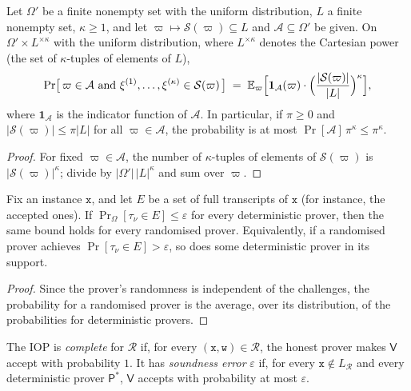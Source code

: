 \begin{lemma}\label{lem:queries}
Let $\Omega'$ be a finite nonempty set with the uniform distribution, $L$ a finite nonempty set, $\kappa \ge 1$, and let $\varpi \mapsto \mathcal{S}(\varpi) \subseteq L$ and $\mathcal{A} \subseteq \Omega'$ be given.
On $\Omega' \times L^{\times\kappa}$ with the uniform distribution, where $L^{\times\kappa}$ denotes the Cartesian power (the set of $\kappa$-tuples of elements of $L$),
\[
  \Pr\bigl[\, \varpi \in \mathcal{A} \text{ and } \xi^{(1)},\dots,\xi^{(\kappa)} \in \mathcal{S}(\varpi) \,\bigr] \;=\; \mathbb{E}_{\varpi}\Bigl[\mathbf{1}_{\mathcal{A}}(\varpi) \cdot \Bigl(\frac{|\mathcal{S}(\varpi)|}{|L|}\Bigr)^{\kappa}\Bigr],
\]
where $\mathbf{1}_{\mathcal{A}}$ is the indicator function of $\mathcal{A}$. In particular, if $\pi \ge 0$ and $|\mathcal{S}(\varpi)| \le \pi |L|$ for all $\varpi \in \mathcal{A}$, the probability is at most $\Pr[\mathcal{A}]\,\pi^\kappa \le \pi^{\kappa}$.
\end{lemma}

\begin{proof}
For fixed $\varpi \in \mathcal{A}$, the number of $\kappa$-tuples of elements of $\mathcal{S}(\varpi)$ is $|\mathcal{S}(\varpi)|^\kappa$; divide by $|\Omega'|\,|L|^\kappa$ and sum over $\varpi$.
\end{proof}

\begin{lemma}\label{lem:randomised}
Fix an instance $\mathtt{x}$, and let $E$ be a set of full transcripts of $\mathtt{x}$ (for instance, the accepted ones). If $\Pr_\Omega[\tau_\nu \in E] \le \varepsilon$ for every deterministic prover, then the same bound holds for every randomised prover. Equivalently, if a randomised prover achieves $\Pr[\tau_\nu \in E] > \varepsilon$, so does some deterministic prover in its support.
\end{lemma}

\begin{proof}
Since the prover's randomness is independent of the challenges, the probability for a randomised prover is the average, over its distribution, of the probabilities for deterministic provers.
\end{proof}

\begin{definition}\label{def:iop-sound}
The IOP is \emph{complete} for $\mathcal{R}$ if, for every $(\mathtt{x},\mathtt{w}) \in \mathcal{R}$, the honest prover makes $\mathsf{V}$ accept with probability $1$.
It has \emph{soundness error} $\varepsilon$ if, for every $\mathtt{x} \notin L_{\mathcal{R}}$ and every deterministic prover $\mathsf{P}^*$, $\mathsf{V}$ accepts with probability at most $\varepsilon$.
\end{definition}

